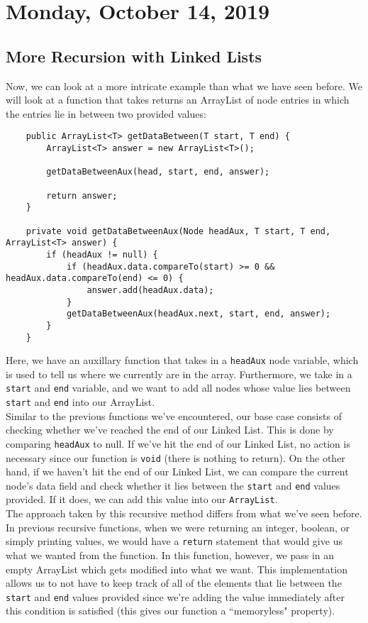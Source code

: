 \section{Monday, October 14, 2019}

\subsection{More Recursion with Linked Lists}

Now, we can look at a more intricate example than what we have seen before. We will look at a function that takes returns an ArrayList of node entries in which the entries lie in between two provided values:

\begin{lstlisting}
    public ArrayList<T> getDataBetween(T start, T end) {
		ArrayList<T> answer = new ArrayList<T>();

		getDataBetweenAux(head, start, end, answer);

		return answer;
	}

	private void getDataBetweenAux(Node headAux, T start, T end, ArrayList<T> answer) {
		if (headAux != null) {
			if (headAux.data.compareTo(start) >= 0 && headAux.data.compareTo(end) <= 0) {
				answer.add(headAux.data);
			}
			getDataBetweenAux(headAux.next, start, end, answer);
		}
	}
\end{lstlisting}

Here, we have an auxillary function that takes in a \verb!headAux! node variable, which is used to tell us where we currently are in the array. Furthermore, we take in a \verb!start! and \verb!end! variable, and we want to add all nodes whose value lies between \verb!start! and \verb!end! into our ArrayList. \\

\noindent Similar to the previous functions we've encountered, our base case consists of checking whether we've reached the end of our Linked List. This is done by comparing \verb!headAux! to null. If we've hit the end of our Linked List, no action is necessary since our function is \verb!void! (there is nothing to return). On the other hand, if we haven't hit the end of our Linked List, we can compare the current node's data field and check whether it lies between the \verb!start! and \verb!end! values provided. If it does, we can add this value into our \verb!ArrayList!. \\

The approach taken by this recursive method differs from what we've seen before. In previous recursive functions, when we were returning an integer, boolean, or simply printing values, we would have a \verb!return! statement that would give us what we wanted from the function. In this function, however, we pass in an empty ArrayList which gets modified into what we want. This implementation allows us to not have to keep track of all of the elements that lie between the \verb!start! and \verb!end! values provided since we're adding the value immediately after this condition is satisfied (this gives our function a ``memoryless" property). \\

